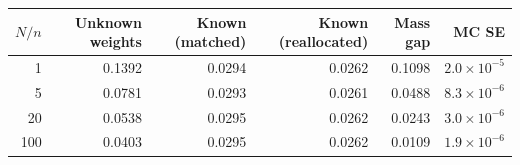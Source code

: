 \begin{tabular}{rrrrrr}
\toprule $N/n$ & Unknown weights & Known (matched) & Known (reallocated) & Mass gap & MC SE \\\midrule
1 & 0.1392 & 0.0294 & 0.0262 & 0.1098 & $2.0\times 10^{-5}$ \\
5 & 0.0781 & 0.0293 & 0.0261 & 0.0488 & $8.3\times 10^{-6}$ \\
20 & 0.0538 & 0.0295 & 0.0262 & 0.0243 & $3.0\times 10^{-6}$ \\
100 & 0.0403 & 0.0295 & 0.0262 & 0.0109 & $1.9\times 10^{-6}$ \\
\bottomrule\end{tabular}